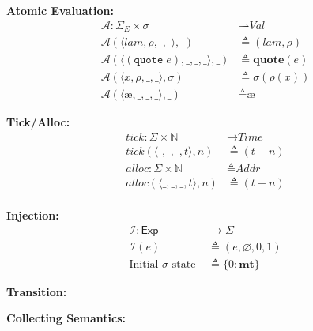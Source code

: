 \documentclass[12pt,draft]{article}
\newcommand\mae{\ensuremath{\text{\ae}}}
\newcommand{\quotesyn}[1]{(\texttt{quote}\;#1)}
\begin{document}
{\begin{multicols*}{2}
\begin{center}
\end{center}
\vspace{-7mm}
\begin{center}
\textbf{Atomic Evaluation:}
\vspace{-3mm}
\begin{align*}
\mathcal{A} : \Sigma_E \times \sigma &\rightharpoonup \textit{Val} \\
\mathcal{A}( \langle lam , \rho , \_ , \_ \rangle, \_)  &\triangleq (lam , \rho) \\
\mathcal{A}( \langle \quotesyn{e} , \_ , \_ , \_ \rangle, \_)  &\triangleq \textbf{quote}(e) \\
\mathcal{A}( \langle x , \rho , \_ , \_ \rangle, \sigma) &\triangleq \sigma(\rho(x)) \\
\mathcal{A}( \langle \mae , \_ , \_ , \_ \rangle, \_) &\triangleq \mae
\end{align*}
\end{center}
\vspace{-7mm}
\begin{center}
\textbf{Tick/Alloc:}
\vspace{-3mm}
\begin{align*}
tick : \Sigma \times \mathbb{N} &\rightarrow \textit{Time} \\
tick(\langle \_, \_ , \_, t \rangle, n) &\triangleq (t + n) \\
alloc : \Sigma \times \mathbb{N} &\triangleq \textit{Addr} \\
alloc(\langle \_, \_ , \_, t \rangle, n) &\triangleq (t + n) \\
\end{align*}
\end{center}
\vspace{-14mm}
\begin{center}
\textbf{Injection:}
\vspace{-3mm}
\begin{align*}
\mathcal{I} : \textsf{Exp} &\rightarrow \Sigma \\
\mathcal{I}(e) &\triangleq (e , \varnothing , 0 , 1) \\
\text{Initial } \sigma \text{ state } &\triangleq \{ 0 : \textbf{mt} \}
\end{align*}
\end{center}
\vspace{-8mm}
\begin{center}
\textbf{Transition:}
\end{center}
\vspace{-10mm}
\begin{center}
\textbf{Collecting Semantics:}
\end{center}
\vspace{-10mm}



\end{multicols*}}
\end{document}
